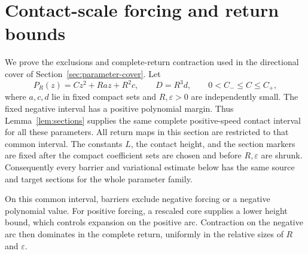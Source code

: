 \section{Contact-scale forcing and return bounds}\label{sec:contact-forcing}
We prove the exclusions and complete-return contraction used in the
directional cover of Section~\ref{sec:parameter-cover}. Let
\begin{equation}\label{eq:contact-scale-family}
 P_R(z)=Cz^2+Ra z+R^2c,\qquad D=R^3d,
 \qquad 0<C_-\le C\le C_+,
\end{equation}
where $a,c,d$ lie in fixed compact sets and $R,\varepsilon>0$
are independently small. The fixed negative interval has a positive
polynomial margin. Thus Lemma~\ref{lem:sections} supplies the same
complete positive-speed contact interval for all these parameters.
All return maps in this section are restricted to that common interval.
The constants $L$, the contact height, and the section markers are fixed
after the compact coefficient sets are chosen and before $R,\varepsilon$
are shrunk.  Consequently every barrier and variational estimate below
has the same source and target sections for the whole parameter family.

On this common interval, barriers exclude negative forcing or a negative
polynomial value. For positive forcing, a rescaled core supplies a lower
height bound, which controls expansion on the positive arc. Contraction
on the negative arc then dominates in the complete return, uniformly in
the relative sizes of $R$ and $\varepsilon$.

